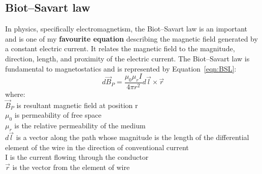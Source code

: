 
\subsection{Biot–Savart law}
In physics, specifically electromagnetism, the Biot–Savart law is an important and is one of my \textbf{favourite equation} describing the magnetic field generated by a constant electric current. It relates the magnetic field to the magnitude, direction, length, and proximity of the electric current. The Biot–Savart law is fundamental to magnetostatics and is represented by Equation~\ref{eqn:BSL}:
\begin{equation}
\label{eqn:BSL}
d\vec{B}_P=\frac{\mu_0\mu_rI}{4\pi r^2}d\vec{l}\times\vec{r}
\end{equation}
where:\\
$\vec{B}_P$  is resultant magnetic field at position r\\
$\mu_0$  is permeability of free space\\
$\mu_r$  is the relative permeability of the medium\\
$d\vec{l}$  is a vector along the path whose magnitude is the length of the      differential element of the wire in the direction of conventional current\\
I  is the current flowing through the conductor\\
$\vec{r}$  is the vector from the element of wire
